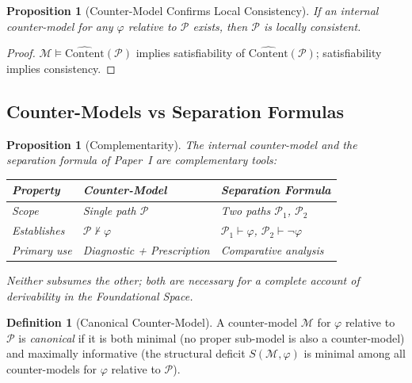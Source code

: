 \documentclass[12pt, a4paper]{article}
\theoremstyle{plain}
\newtheorem{proposition}[theorem]{Proposition}
\theoremstyle{definition}
\newtheorem{definition}[theorem]{Definition}
\theoremstyle{remark}
\newcommand{\CC}[1]{\widehat{\mathrm{Content}}(#1)}
\begin{document}
\begin{proposition}[Counter-Model Confirms Local Consistency]
\label{prop:cm-lc}
If an internal counter-model for any $\varphi$ relative to
$\mathcal{P}$ exists, then $\mathcal{P}$ is locally consistent.
\end{proposition}

\begin{proof}
$\mathcal{M} \models \CC{\mathcal{P}}$ implies satisfiability of
$\CC{\mathcal{P}}$; satisfiability implies consistency.
\end{proof}

\subsection{Counter-Models vs Separation Formulas}
\label{subsec:cm-sep}

\begin{proposition}[Complementarity]
\label{prop:cm-sep}
The internal counter-model and the separation formula of Paper~I are
complementary tools:

\smallskip
\begin{center}
\begin{tabular}{lll}
\toprule
Property & Counter-Model & Separation Formula \\
\midrule
Scope & Single path $\mathcal{P}$ & Two paths $\mathcal{P}_1$,
  $\mathcal{P}_2$ \\
Establishes & $\mathcal{P} \nvdash \varphi$ &
  $\mathcal{P}_1 \vdash \varphi$, $\mathcal{P}_2 \vdash \neg\varphi$ \\
Primary use & Diagnostic + Prescription & Comparative analysis \\
\bottomrule
\end{tabular}
\end{center}

\smallskip
Neither subsumes the other; both are necessary for a complete account
of derivability in the Foundational Space.
\end{proposition}

\begin{definition}[Canonical Counter-Model]
\label{def:canonical-cm}
A counter-model $\mathcal{M}$ for $\varphi$ relative to $\mathcal{P}$
is \emph{canonical} if it is both minimal (no proper sub-model is
also a counter-model) and maximally informative (the structural
deficit $S(\mathcal{M},\varphi)$ is minimal among all counter-models
for $\varphi$ relative to $\mathcal{P}$).
\end{definition}
\end{document}
